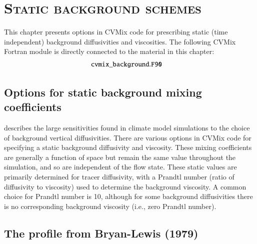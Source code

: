 \chapter{\scshape Static background schemes}
\label{chapter:cvmix_background}

\minitoc
\vspace{.5cm}

This chapter presents options in CVMix code for prescribing static
(time independent) background diffusivities and viscosities.  The
following CVMix Fortran module is directly connected to the material
in this chapter:
\begin{align*} 
 &{\tt cvmix\_background.F90}
\end{align*}


\section{Options for static background mixing coefficients}
\label{section:background-diffusivities}

\cite{Jochum2009} describes the large sensitivities found in climate
model simulations to the choice of background vertical diffusivities.
There are various options in CVMix code for specifying a static
background diffusivity and viscosity.  These mixing coefficients are
generally a function of space but remain the same value throughout the
simulation, and so are independent of the flow state.  These static
values are primarily determined for tracer diffusivity, with a Prandtl
number (ratio of diffusivity to viscosity) used to determine the
background viscosity.  A common choice for Prandtl number is 10,
although for some background diffusivities there is no corresponding
background viscosity (i.e., zero Prandtl number).


\section{The profile from Bryan-Lewis (1979)} 
\label{section:bryan-lewis}

